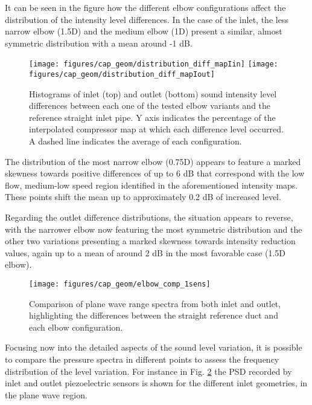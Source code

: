 It can be seen in the figure how the different elbow configurations affect the distribution of the intensity level differences. In the case of the inlet, the less narrow elbow (1.5D) and the medium elbow (1D) present a similar, almost symmetric distribution with a mean around -1 dB.

\begin{figure}[htb!]
\centering
\texttt{[image: figures/cap\_geom/distribution\_diff\_mapIin]}
\texttt{[image: figures/cap\_geom/distribution\_diff\_mapIout]}
\caption{Histograms of inlet (top) and outlet (bottom) sound intensity level differences between each one of the tested elbow variants and the reference straight inlet pipe. Y axis indicates the percentage of the interpolated compressor map at which each difference level occurred. A dashed line indicates the average of each configuration.}
\label{fig:elbow_intens_histog}
\end{figure}

The distribution of the most narrow elbow (0.75D) appears to feature a marked skewness towards positive differences of up to 6 dB that correspond with the low flow, medium-low speed region identified in the aforementioned intensity maps. These points shift the mean up to approximately 0.2 dB of increased level.

Regarding the outlet difference distributions, the situation appears to reverse, with the narrower elbow now featuring the most symmetric distribution and the other two variations presenting a marked skewness towards intensity reduction values, again up to a mean of around 2 dB in the most favorable case (1.5D elbow).

\begin{figure}[h!]
\centering
\texttt{[image: figures/cap\_geom/elbow\_comp\_1sens]}
\caption{Comparison of plane wave range spectra from both inlet and outlet, highlighting the differences between the straight reference duct and each elbow configuration.}
\label{fig:elbow_comp_1sens}
\end{figure}

Focusing now into the detailed aspects of the sound level variation, it is possible to compare the pressure spectra in different points to assess the frequency distribution of the level variation. For instance in Fig. \ref{fig:elbow_comp_1sens} the PSD recorded by inlet and outlet piezoelectric sensors is shown for the different inlet geometries, in the plane wave region.

